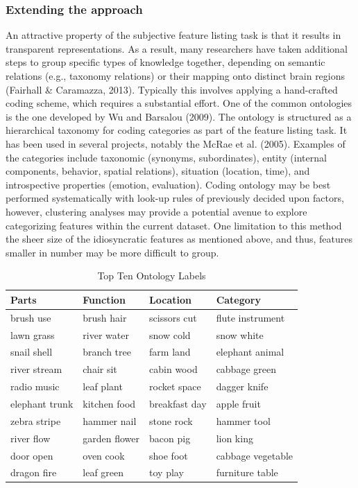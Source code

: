\documentclass[man]{apa6}
\begin{document}
\hypertarget{extending-the-approach}{%
\subsubsection{Extending the approach}\label{extending-the-approach}}

An attractive property of the subjective feature listing task is that it results in transparent representations. As a result, many researchers have taken additional steps to group specific types of knowledge together, depending on semantic relations (e.g., taxonomy relations) or their mapping onto distinct brain regions (Fairhall \& Caramazza, 2013). Typically this involves applying a hand-crafted coding scheme, which requires a substantial effort. One of the common ontologies is the one developed by Wu and Barsalou (2009). The ontology is structured as a hierarchical taxonomy for coding categories as part of the feature listing task. It has been used in several projects, notably the McRae et al. (2005). Examples of the categories include taxonomic (synonyms, subordinates), entity (internal components, behavior, spatial relations), situation (location, time), and introspective properties (emotion, evaluation). Coding ontology may be best performed systematically with look-up rules of previously decided upon factors, however, clustering analyses may provide a potential avenue to explore categorizing features within the current dataset. One limitation to this method the sheer size of the idiosyncratic features as mentioned above, and thus, features smaller in number may be more difficult to group.

\begin{table}[t]

\caption{\label{tab:tab8}Top Ten Ontology Labels}
\centering
\begin{tabular}{llll}
\toprule
Parts & Function & Location & Category\\
\midrule
brush use & brush hair & scissors cut & flute instrument\\
lawn grass & river water & snow cold & snow white\\
snail shell & branch tree & farm land & elephant animal\\
river stream & chair sit & cabin wood & cabbage green\\
radio music & leaf plant & rocket space & dagger knife\\
\addlinespace
elephant trunk & kitchen food & breakfast day & apple fruit\\
zebra stripe & hammer nail & stone rock & hammer tool\\
river flow & garden flower & bacon pig & lion king\\
door open & oven cook & shoe foot & cabbage vegetable\\
dragon fire & leaf green & toy play & furniture table\\
\bottomrule
\end{tabular}
\end{table}
\end{document}
